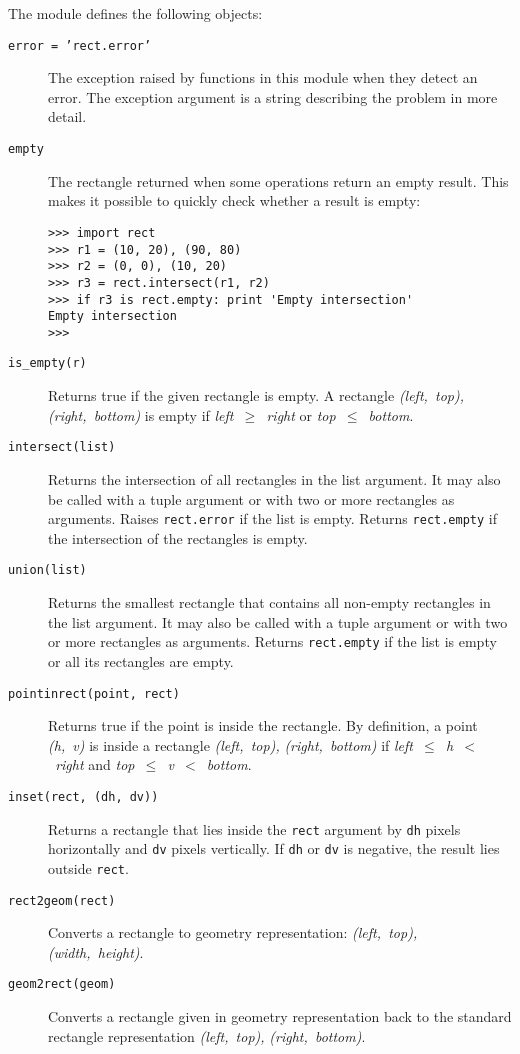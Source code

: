 The module defines the following objects:
\begin{description}
\item[{\tt error = 'rect.error'}]
The exception raised by functions in this module when they detect an
error.
The exception argument is a string describing the problem in more
detail.
\item[{\tt empty}]
The rectangle returned when some operations return an empty result.
This makes it possible to quickly check whether a result is empty:
\begin{code}\begin{verbatim}
>>> import rect
>>> r1 = (10, 20), (90, 80)
>>> r2 = (0, 0), (10, 20)
>>> r3 = rect.intersect(r1, r2)
>>> if r3 is rect.empty: print 'Empty intersection'
Empty intersection
>>> 
\end{verbatim}\end{code}
\item[{\tt is\_empty(r)}]
Returns true if the given rectangle is empty.
A rectangle
{\em (left,~top), (right,~bottom)}
is empty if
{\em left~$\geq$~right}
or
{\em top~$\leq$~bottom}.
\item[{\tt intersect(list)}]
Returns the intersection of all rectangles in the list argument.
It may also be called with a tuple argument or with two or more
rectangles as arguments.
Raises
{\tt rect.error}
if the list is empty.
Returns
{\tt rect.empty}
if the intersection of the rectangles is empty.
\item[{\tt union(list)}]
Returns the smallest rectangle that contains all non-empty rectangles in
the list argument.
It may also be called with a tuple argument or with two or more
rectangles as arguments.
Returns
{\tt rect.empty}
if the list is empty or all its rectangles are empty.
\item[{\tt pointinrect(point, rect)}]
Returns true if the point is inside the rectangle.
By definition, a point
{\em (h,~v)}
is inside a rectangle
{\em (left,~top),}
{\em (right,~bottom)}
if
{\em left~$\leq$~h~$<$~right}
and
{\em top~$\leq$~v~$<$~bottom}.
\item[{\tt inset(rect, (dh, dv))}]
Returns a rectangle that lies inside the
{\tt rect}
argument by
{\tt dh}
pixels horizontally
and
{\tt dv}
pixels
vertically.
If
{\tt dh}
or
{\tt dv}
is negative, the result lies outside
{\tt rect}.
\item[{\tt rect2geom(rect)}]
Converts a rectangle to geometry representation:
{\em (left,~top),}
{\em (width,~height)}.
\item[{\tt geom2rect(geom)}]
Converts a rectangle given in geometry representation back to the
standard rectangle representation
{\em (left,~top),}
{\em (right,~bottom)}.
\end{description}

